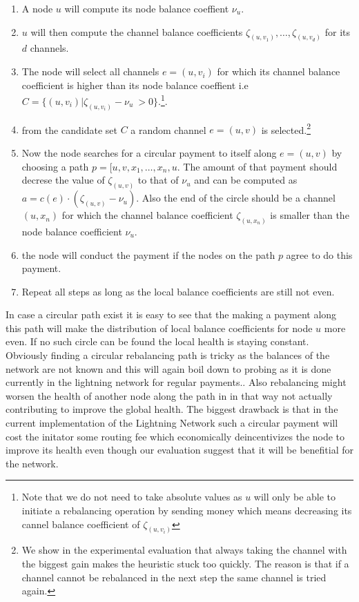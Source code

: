 \documentclass[a4paper]{paper}
\begin{document}
\begin{enumerate}
\item A node $u$ will compute its node balance coeffient $\nu_u$.
\item $u$ will then compute the channel balance coefficients $\zeta_{(u,v_1)},\dots,\zeta_{(u,v_d)}$ for its $d$ channels.
\item The node will select all channels $e=(u,v_i)$ for which its channel balance coefficient is higher than its node balance coeffient i.e $C = \{(u,v_i) | \zeta_{(u,v_i)} - \nu_u\ > 0\}$.\footnote{Note that we do not need to take absolute values as $u$ will only be able to initiate a rebalancing operation by sending money which means decreasing its cannel balance coefficient of $\zeta_{(u,v_i)}$}.
\item from the candidate set $C$ a random channel $e=(u,v)$ is selected.\footnote{We show in the experimental evaluation that always taking the channel with the biggest gain makes the heuristic stuck too quickly. The reason is that if a channel cannot be rebalanced in the next step the same channel is tried again.} 
\item Now the node searches for a circular payment to itself along $e=(u,v)$ by choosing a path $p = [u,v,x_1,\dots,x_n,u$. The amount of that payment should decrese the value of $\zeta_{(u,v)}$ to that of $\nu_u$ and can be computed as $a = c(e)\cdot (\zeta_{(u,v)}-\nu_u)$. Also the end of the circle should be a channel $(u,x_n)$ for which the channel balance coefficient $\zeta_{(u,x_n)}$ is smaller than the node balance coefficient $\nu_u$.
\item the node will conduct the payment if the nodes on the path $p$ agree to do this payment. 
 \item Repeat all steps as long as the local balance coefficients are still not even.
\end{enumerate}

In case a circular path exist it is easy to see that the making a payment along this path will make the distribution of local balance coefficients for node $u$ more even.
If no such circle can be found the local health is staying constant.
Obviously finding a circular rebalancing path is tricky as the balances of the network are not known and this will again boil down to probing as it is done currently in the lightning network for regular payments..
Also rebalancing might worsen the health of another node along the path in in that way not actually contributing to improve the global health.
The biggest drawback is that in the current implementation of the Lightning Network such a circular payment will cost the initator some routing fee which economically deincentivizes the node to improve its health even though our evaluation suggest that it will be benefitial for the network.
\end{document}
